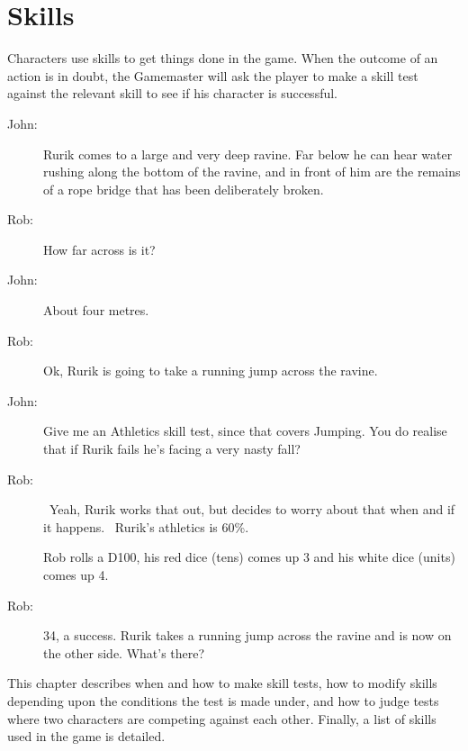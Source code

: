 \chapter{Skills}
\label{ch:skills}

Characters use skills to get things done in the game. When the outcome of an action is in doubt, the Gamemaster will ask the player to make a skill test against the relevant skill to see if his character is successful.

\begin{rpg-examplebox}
\begin{description}
	\item[John:] Rurik comes to a large and very deep ravine. Far below he can hear water rushing along the bottom of the ravine, and in front of him are the remains of a rope bridge that has been deliberately broken.
	\item[Rob:] How far across is it?
	\item[John:] About four metres.
	\item[Rob:] Ok, Rurik is going to take a running jump across the ravine.
	\item[John:] Give me an Athletics skill test, since that covers Jumping. You do realise that if Rurik fails he’s facing a very nasty fall?
	\item[Rob:] Yeah, Rurik works that out, but decides to worry about that when and if it happens.  Rurik’s athletics is 60\%.
	\item[] Rob rolls a D100, his red dice (tens) comes up 3 and his white dice (units) comes up 4.
	\item[Rob:] 34, a success. Rurik takes a running jump across the ravine and is now on the other side. What’s there?
\end{description}
\end{rpg-examplebox}

This chapter describes when and how to make skill tests, how to modify skills depending upon the conditions the test is made under, and how to judge tests where two characters are competing against each other. Finally, a list of skills used in the game is detailed.

